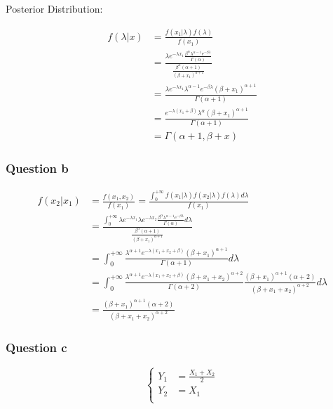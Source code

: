 \documentclass[]{article}
\begin{document}
Posterior Distribution:

\[\begin{split}
f(\lambda|x)&=\frac{f(x_1|\lambda)f(\lambda)}{f(x_1)}\\
&=\frac{\lambda e^{-\lambda x_1}\frac{\beta^\alpha \lambda^{\alpha-1}e^{-\beta\lambda}}{\Gamma(\alpha)}}{\frac{\beta^\alpha(\alpha+1)}{(\beta+x_1)^{\alpha+1}}}\\
&=\frac{\lambda e^{-\lambda x_1}\lambda^{\alpha-1}e^{-\beta\lambda}(\beta+x_1)^{\alpha+1}}{\Gamma(\alpha+1)}\\
&=\frac{e^{-\lambda(x_1+\beta)}\lambda^\alpha(\beta+x_1)^{\alpha+1}}{\Gamma(\alpha+1)}\\
&=\Gamma(\alpha+1,\beta+x)
\end{split}\]

\hypertarget{question-b-2}{%
\subsubsection{Question b}\label{question-b-2}}

\[\begin{split}
f(x_2|x_1)&=\frac{f(x_1,x_2)}{f(x_1)}=\frac{\int_0^{+\infty}f(x_1|\lambda)f(x_2|\lambda)f(\lambda)d\lambda}{f(x_1)}\\
&=\frac{\int_0^{+\infty}\lambda e^{-\lambda x_1}\lambda e^{-\lambda x_2}\frac{\beta^\alpha\lambda^{\alpha-1}e^{-\beta\lambda}}{\Gamma(\alpha)}d\lambda}{\frac{\beta^\alpha(\alpha+1)}{(\beta+x_1)^{\alpha+1}}}\\
&=\int_0^{+\infty}\frac{\lambda^{\alpha+1}e^{-\lambda(x_1+x_2+\beta)}(\beta+x_1)^{\alpha+1}}{\Gamma(\alpha+1)}d\lambda\\
&=\int_0^{+\infty}\frac{\lambda^{\alpha+1}e^{-\lambda(x_1+x_2+\beta)}(\beta+x_1+x_2)^{\alpha+2}}{\Gamma(\alpha+2)}\frac{(\beta+x_1)^{\alpha+1}(\alpha+2)}{(\beta+x_1+x_2)^{\alpha+2}}d\lambda\\
&=\frac{(\beta+x_1)^{\alpha+1}(\alpha+2)}{(\beta+x_1+x_2)^{\alpha+2}}
\end{split}\]

\hypertarget{question-c-1}{%
\subsubsection{Question c}\label{question-c-1}}

\[\left\{
\begin{aligned}
Y_1 & = \frac{X_1+X_2}{2} \\
Y_2 & = X_1 \\
\end{aligned}
\right.\]
\end{document}
